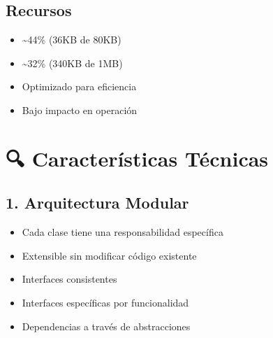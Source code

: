 \documentclass[a4paper,11pt,spanish]{sphinxmanual}
\begin{document}
\section{Recursos}
\label{\detokenize{index:recursos}}\begin{itemize}
\item {} 
\sphinxAtStartPar
{} \textasciitilde{}44\% (36KB de 80KB)

\item {} 
\sphinxAtStartPar
{} \textasciitilde{}32\% (340KB de 1MB)

\item {} 
\sphinxAtStartPar
{} Optimizado para eficiencia

\item {} 
\sphinxAtStartPar
{} Bajo impacto en operación

\end{itemize}


\chapter{🔍 Características Técnicas}
\label{\detokenize{index:caracteristicas-tecnicas}}

\section{1. Arquitectura Modular}
\label{\detokenize{index:arquitectura-modular}}\begin{itemize}
\item {} 
\sphinxAtStartPar
{} Cada clase tiene una responsabilidad específica

\item {} 
\sphinxAtStartPar
{} Extensible sin modificar código existente

\item {} 
\sphinxAtStartPar
{} Interfaces consistentes

\item {} 
\sphinxAtStartPar
{} Interfaces específicas por funcionalidad

\item {} 
\sphinxAtStartPar
{} Dependencias a través de abstracciones

\end{itemize}
\end{document}
